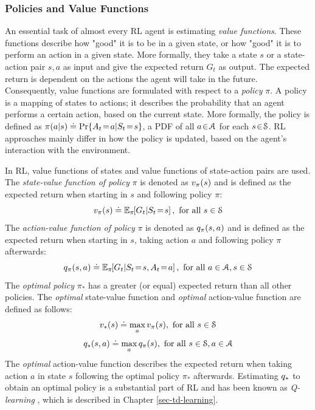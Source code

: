 \documentclass[a4paper, twoside, 12pt]{article}
\let\cite\shortcite
\begin{document}
\subsubsection{Policies and Value Functions \label{sec-policies}}
\label{sec:orgd39ad8e}
An essential task of almost every RL agent is estimating \emph{value functions}.
These functions describe how "good" it is to be in a given state, or how "good"
it is to perform an action in a given state. More formally, they take a state
\(s\) or a state-action pair \(s,a\) as input and give the expected return \(G_t\) as
output. The expected return is dependent on the actions the agent will take in
the future. Consequently, value functions are formulated with respect to a
\emph{policy} \(\pi\). A policy is a mapping of states to actions; it describes the
probability that an agent performs a certain action, based on the current state.
More formally, the policy is defined as
\(\pi(a|s)\defeq\Pr{A_t\!=\!a|S_t\!=\!s}\), a PDF of all \(a\!\in\!\A\) for each
\(s\!\in\!\S\). RL approaches mainly differ in how the policy is updated, based on
the agent's interaction with the environment.

In RL, value functions of states and value functions of state-action pairs are
used. The \emph{state-value function of policy} \(\pi\) is denoted as \(\vpi(s)\) and is
defined as the expected return when starting in \(s\) and following policy \(\pi\):
\begin{equation}
    \vpi(s) \defeq \EE{\pi}{G_t|S_t\!=\!s}, \text{ for all } s\in\S
\end{equation}
The \emph{action-value function of policy} \(\pi\) is denoted as \(\qpi(s,a)\) and is
defined as the expected return when starting in \(s\), taking action \(a\) and
following policy \(\pi\) afterwards:
\begin{equation}
    \qpi(s,a) \defeq \EE{\pi}{G_t|S_t\!=\!s, A_t\!=\!a}, \text{ for all } a\in\A, s\in\S
\end{equation}
The \emph{optimal policy} \(\pi_*\) has a greater (or equal) expected return than all
other policies.  The \emph{optimal} state-value function and \emph{optimal} action-value
function are defined as follows:
\begin{equation}
    \vstar(s) \defeq \max_a \vpi(s), \text{ for all } s\in\S
\end{equation}
\begin{equation}
    \qstar(s,a) \defeq \max_a \qpi(s), \text{ for all } s\in\S, a\in\A
\end{equation}
The \emph{optimal} action-value function describes the expected return when taking
action \(a\) in state \(s\) following the optimal policy \(\pi_*\) afterwards.
Estimating \(\qstar\) to obtain an optimal policy is a substantial part of RL and
has been known as \emph{Q-learning} \cite{watkins92_q_learn}, which is described in
Chapter \ref{sec-td-learning}.
\end{document}
